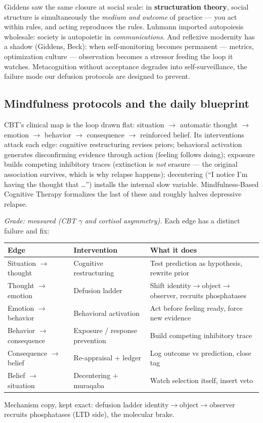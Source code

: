 \documentclass[11pt]{article}
\begin{document}
Giddens saw the same closure at social scale: in \textbf{structuration theory}, social structure is simultaneously the \emph{medium and outcome} of practice --- you act within rules, and acting reproduces the rules. Luhmann imported autopoiesis wholesale: society is autopoietic in \emph{communications}. And reflexive modernity has a shadow (Giddens, Beck): when self-monitoring becomes permanent --- metrics, optimization culture --- observation becomes a stressor feeding the loop it watches. Metacognition without acceptance degrades into self-surveillance, the failure mode our defusion protocols are designed to prevent.

\subsection{Mindfulness protocols and the daily blueprint}

CBT's clinical map is the loop drawn flat: situation $\to$ automatic thought $\to$ emotion $\to$ behavior $\to$ consequence $\to$ reinforced belief. Its interventions attack each edge: cognitive restructuring revises priors; behavioral activation generates disconfirming evidence through action (feeling follows doing); exposure builds competing inhibitory traces (extinction is \emph{not} erasure --- the original association survives, which is why relapse happens); decentering (``I notice I'm having the thought that \dots'') installs the internal slow variable. Mindfulness-Based Cognitive Therapy formalizes the last of these and roughly halves depressive relapse.

\textit{Grade: measured (CBT $\gamma$ and cortisol asymmetry).} Each edge has a distinct failure and fix:
\begin{center}
\small
\begin{tabular}{p{2.6cm}p{3.2cm}p{4.4cm}}
\toprule
Edge & Intervention & What it does \\ \midrule
Situation $\to$ thought & Cognitive restructuring & Test prediction as hypothesis, rewrite prior \\ 
Thought $\to$ emotion & Defusion ladder & Shift identity$\to$object$\to$observer, recruits phosphatases \\ 
Emotion $\to$ behavior & Behavioral activation & Act before feeling ready, force new evidence \\ 
Behavior $\to$ consequence & Exposure / response prevention & Build competing inhibitory trace \\ 
Consequence $\to$ belief & Re-appraisal + ledger & Log outcome vs prediction, close tag \\ 
Belief $\to$ situation & Decentering + muraqaba & Watch selection itself, insert veto \\ 
\bottomrule
\end{tabular}
\end{center}
Mechanism copy, kept exact: defusion ladder identity$\to$object$\to$observer recruits phosphatases (LTD side), the molecular brake.
\end{document}
